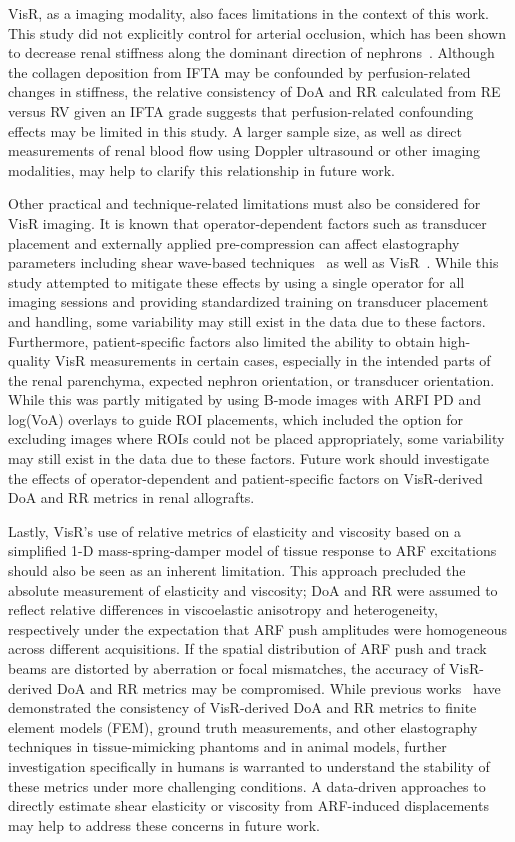 VisR, as a imaging modality, also faces limitations in the context of this work. This study did not explicitly control for arterial occlusion, which has been shown to decrease renal stiffness along the dominant direction of nephrons~\cite{gennisson_Supersonic_2012,urban_Novel_2021,lim_Shear_2021}. Although the collagen deposition from IFTA may be confounded by perfusion-related changes in stiffness, the relative consistency of DoA and RR calculated from RE versus RV given an IFTA grade suggests that perfusion-related confounding effects may be limited in this study. A larger sample size, as well as direct measurements of renal blood flow using Doppler ultrasound or other imaging modalities, may help to clarify this relationship in future work.

Other practical and technique-related limitations must also be considered for VisR imaging. It is known that operator-dependent factors such as transducer placement and externally applied pre-compression can affect elastography parameters including shear wave-based techniques~\cite{barr_Effects_2012} as well as VisR~\cite{phillips_Surface_2025}. While this study attempted to mitigate these effects by using a single operator for all imaging sessions and providing standardized training on transducer placement and handling, some variability may still exist in the data due to these factors. Furthermore, patient-specific factors also limited the ability to obtain high-quality VisR measurements in certain cases, especially in the intended parts of the renal parenchyma, expected nephron orientation, or transducer orientation. While this was partly mitigated by using B-mode images with ARFI PD and log(VoA) overlays to guide ROI placements, which included the option for excluding images where ROIs could not be placed appropriately, some variability may still exist in the data due to these factors. Future work should investigate the effects of operator-dependent and patient-specific factors on VisR-derived DoA and RR metrics in renal allografts.

Lastly, VisR's use of relative metrics of elasticity and viscosity based on a simplified 1-D mass-spring-damper model of tissue response to ARF excitations should also be seen as an inherent limitation. This approach precluded the absolute measurement of elasticity and viscosity; DoA and RR were assumed to reflect relative differences in viscoelastic anisotropy and heterogeneity, respectively under the expectation that ARF push amplitudes were homogeneous across different acquisitions. If the spatial distribution of ARF push and track beams are distorted by aberration or focal mismatches, the accuracy of VisR-derived DoA and RR metrics may be compromised. While previous works~\cite{hossain_Viscoelastic_2018,hossain_Quantitative_2022} have demonstrated the consistency of VisR-derived DoA and RR metrics to finite element models (FEM), ground truth measurements, and other elastography techniques in tissue-mimicking phantoms and in animal models, further investigation specifically in humans is warranted to understand the stability of these metrics under more challenging conditions. A data-driven approaches to directly estimate shear elasticity or viscosity from ARF-induced displacements~\cite{richardson_Quantitative_2024} may help to address these concerns in future work.
